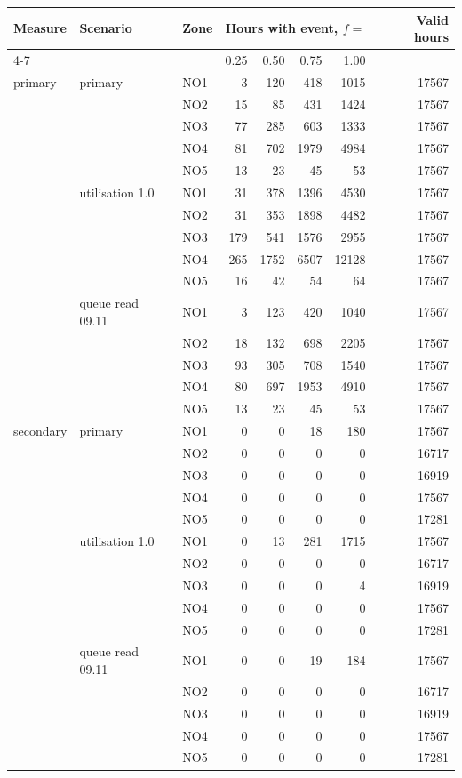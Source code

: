 \begin{tabular}{lllrrrrr}
\toprule
Measure & Scenario & Zone & \multicolumn{4}{c}{Hours with event, $f =$} & Valid hours \\
\cmidrule(lr){4-7}
 & & & 0.25 & 0.50 & 0.75 & 1.00 & \\
\midrule
primary & primary & NO1 & 3 & 120 & 418 & 1015 & 17567 \\
 &  & NO2 & 15 & 85 & 431 & 1424 & 17567 \\
 &  & NO3 & 77 & 285 & 603 & 1333 & 17567 \\
 &  & NO4 & 81 & 702 & 1979 & 4984 & 17567 \\
 &  & NO5 & 13 & 23 & 45 & 53 & 17567 \\
\addlinespace
 & utilisation 1.0 & NO1 & 31 & 378 & 1396 & 4530 & 17567 \\
 &  & NO2 & 31 & 353 & 1898 & 4482 & 17567 \\
 &  & NO3 & 179 & 541 & 1576 & 2955 & 17567 \\
 &  & NO4 & 265 & 1752 & 6507 & 12128 & 17567 \\
 &  & NO5 & 16 & 42 & 54 & 64 & 17567 \\
\addlinespace
 & queue read 09.11 & NO1 & 3 & 123 & 420 & 1040 & 17567 \\
 &  & NO2 & 18 & 132 & 698 & 2205 & 17567 \\
 &  & NO3 & 93 & 305 & 708 & 1540 & 17567 \\
 &  & NO4 & 80 & 697 & 1953 & 4910 & 17567 \\
 &  & NO5 & 13 & 23 & 45 & 53 & 17567 \\
\addlinespace
secondary & primary & NO1 & 0 & 0 & 18 & 180 & 17567 \\
 &  & NO2 & 0 & 0 & 0 & 0 & 16717 \\
 &  & NO3 & 0 & 0 & 0 & 0 & 16919 \\
 &  & NO4 & 0 & 0 & 0 & 0 & 17567 \\
 &  & NO5 & 0 & 0 & 0 & 0 & 17281 \\
\addlinespace
 & utilisation 1.0 & NO1 & 0 & 13 & 281 & 1715 & 17567 \\
 &  & NO2 & 0 & 0 & 0 & 0 & 16717 \\
 &  & NO3 & 0 & 0 & 0 & 4 & 16919 \\
 &  & NO4 & 0 & 0 & 0 & 0 & 17567 \\
 &  & NO5 & 0 & 0 & 0 & 0 & 17281 \\
\addlinespace
 & queue read 09.11 & NO1 & 0 & 0 & 19 & 184 & 17567 \\
 &  & NO2 & 0 & 0 & 0 & 0 & 16717 \\
 &  & NO3 & 0 & 0 & 0 & 0 & 16919 \\
 &  & NO4 & 0 & 0 & 0 & 0 & 17567 \\
 &  & NO5 & 0 & 0 & 0 & 0 & 17281 \\
\bottomrule
\end{tabular}
